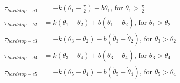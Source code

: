 \documentclass[11pt]{article}
\begin{document}
    \pagestyle{empty}

    \begin{align*}
        \tau_{hardstop-a1} &= -k(\theta_1 - \frac{\pi}{2}) - b \dot{\theta}_1 \text{, for } \theta_1 > \frac{\pi}{2} \\
        \tau_{hardstop-b2} &= k(\theta_1 - \theta_2) + b (\dot{\theta}_1 - \dot{\theta}_2) \text{, for } \theta_1 > \theta_2 \\
        \tau_{hardstop-c3} &= -k(\theta_3 - \theta_2) - b (\dot{\theta}_3 - \dot{\theta}_2) \text{, for } \theta_3 > \theta_2 \\
        \tau_{hardstop-d4} &= k(\theta_3 - \theta_4) + b (\dot{\theta}_3 - \dot{\theta}_4) \text{, for } \theta_3 > \theta_4 \\
        \tau_{hardstop-e5} &= -k(\theta_5 - \theta_4) - b (\dot{\theta}_5 - \dot{\theta}_4) \text{, for } \theta_5 > \theta_4
    \end{align*}
\end{document}
